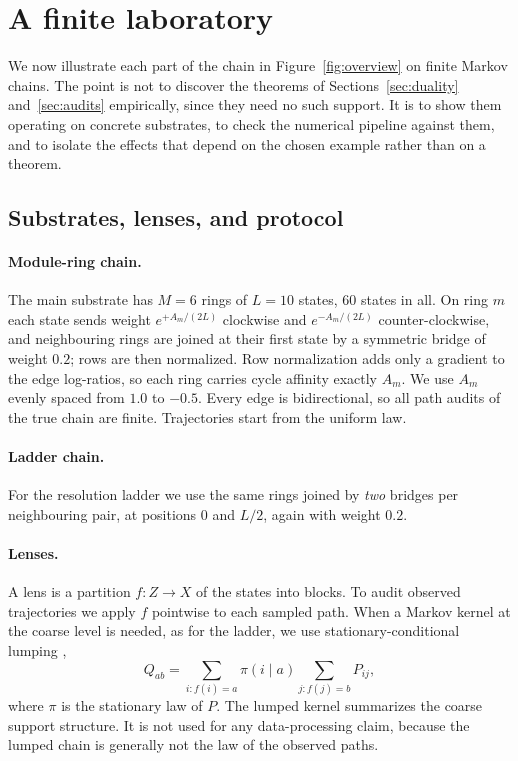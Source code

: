 \section{A finite laboratory}\label{sec:lab}

We now illustrate each part of the chain in Figure~\ref{fig:overview} on finite Markov chains. The point is not to discover the theorems of Sections~\ref{sec:duality} and~\ref{sec:audits} empirically, since they need no such support. It is to show them operating on concrete substrates, to check the numerical pipeline against them, and to isolate the effects that depend on the chosen example rather than on a theorem.

\subsection{Substrates, lenses, and protocol}\label{sec:lab-setup}

\paragraph{Module-ring chain.} The main substrate has \(M=6\) rings of \(L=10\) states, \(60\) states in all. On ring \(m\) each state sends weight \(e^{+A_m/(2L)}\) clockwise and \(e^{-A_m/(2L)}\) counter-clockwise, and neighbouring rings are joined at their first state by a symmetric bridge of weight \(0.2\); rows are then normalized. Row normalization adds only a gradient to the edge log-ratios, so each ring carries cycle affinity exactly \(A_m\). We use \(A_m\) evenly spaced from \(1.0\) to \(-0.5\). Every edge is bidirectional, so all path audits of the true chain are finite. Trajectories start from the uniform law.

\paragraph{Ladder chain.} For the resolution ladder we use the same rings joined by \emph{two} bridges per neighbouring pair, at positions \(0\) and \(L/2\), again with weight \(0.2\).

\paragraph{Lenses.} A lens is a partition \(f:Z\to X\) of the states into blocks. To audit observed trajectories we apply \(f\) pointwise to each sampled path. When a Markov kernel at the coarse level is needed, as for the ladder, we use stationary-conditional lumping \cite{kemeny1960finite,buchholz1994lumpability},
\[
Q_{ab}=\sum_{i:f(i)=a}\pi(i\mid a)\sum_{j:f(j)=b}P_{ij},
\]
where \(\pi\) is the stationary law of \(P\). The lumped kernel summarizes the coarse support structure. It is not used for any data-processing claim, because the lumped chain is generally not the law of the observed paths.

